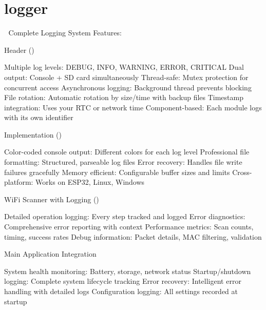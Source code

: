 \chapter{logger }
\hypertarget{md_logger}{}\label{md_logger}
🚀 Complete Logging System Features\+:
\begin{DoxyEnumerate}
\item {} Header ()
\end{DoxyEnumerate}

Multiple log levels\+: DEBUG, INFO, WARNING, ERROR, CRITICAL Dual output\+: Console + SD card simultaneously Thread-\/safe\+: Mutex protection for concurrent access Asynchronous logging\+: Background thread prevents blocking File rotation\+: Automatic rotation by size/time with backup files Timestamp integration\+: Uses your RTC or network time Component-\/based\+: Each module logs with its own identifier


\begin{DoxyEnumerate}
\item {} Implementation ()
\end{DoxyEnumerate}

Color-\/coded console output\+: Different colors for each log level Professional file formatting\+: Structured, parseable log files Error recovery\+: Handles file write failures gracefully Memory efficient\+: Configurable buffer sizes and limits Cross-\/platform\+: Works on ESP32, Linux, Windows


\begin{DoxyEnumerate}
\item Wi\+Fi Scanner with Logging ()
\end{DoxyEnumerate}

Detailed operation logging\+: Every step tracked and logged Error diagnostics\+: Comprehensive error reporting with context Performance metrics\+: Scan counts, timing, success rates Debug information\+: Packet details, MAC filtering, validation


\begin{DoxyEnumerate}
\item Main Application Integration
\end{DoxyEnumerate}

System health monitoring\+: Battery, storage, network status Startup/shutdown logging\+: Complete system lifecycle tracking Error recovery\+: Intelligent error handling with detailed logs Configuration logging\+: All settings recorded at startup

